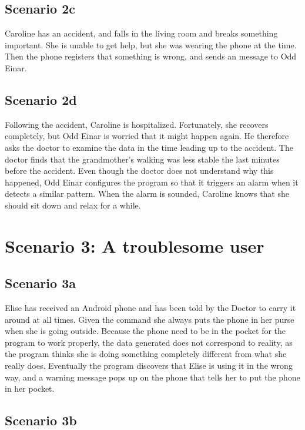 \subsection*{Scenario 2c}
Caroline has an accident, and falls in the living room and breaks something important. She is unable to get help, but she was wearing the phone at the time. Then the phone registers that something is wrong, and sends an message to Odd Einar. 

\subsection*{Scenario 2d}

Following the accident, Caroline is hospitalized. Fortunately, she recovers completely, but Odd Einar is worried that it might happen again. He therefore asks the doctor to examine the data in the time leading up to the accident. The doctor finds that the grandmother’s walking was less stable the last minutes before the accident. Even though the doctor does not understand why this happened, Odd Einar configures the program so that it triggers an alarm when it detects a similar pattern. When the alarm is sounded, Caroline knows that she should sit down and relax for a while.


\section{Scenario 3: A troublesome user}

\subsection*{Scenario 3a}

Elise has received an Android phone and has been told by the Doctor to carry it around at all times. Given the command she always puts the phone in her purse when she is going outside. Because the phone need to be in the pocket for the program to work properly, the data generated does not correspond to reality, as the program thinks she is doing something completely different from what she really does. Eventually the program discovers that Elise is using it in the wrong way, and a warning message pops up on the phone that tells her to put the phone in her pocket.

\subsection*{Scenario 3b}

